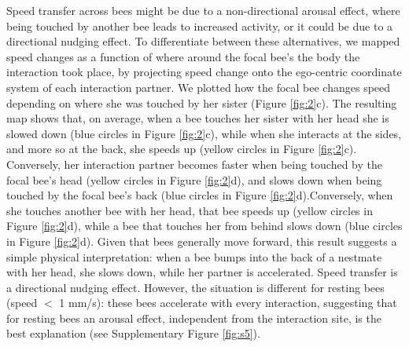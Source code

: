\documentclass{article}
\newcommand{\added}[1]{{\color{blue}#1}}
\newcommand{\deleted}[1]{{\color{red}#1}} %
\newcommand{\replaced}[2]{\deleted{#1}\added{#2}}
\newcommand{\added}[1]{#1}
\newcommand{\deleted}[1]{}
\newcommand{\replaced}[2]{#2}
\begin{document}
Speed transfer across bees might be due to a non-directional arousal effect, where being touched by another bee leads to increased activity, or it could be due to a directional nudging effect. To differentiate between these alternatives, we mapped speed changes as a function of where around the focal bee's the body the interaction took place, by projecting speed change onto the ego-centric coordinate system of each interaction partner. We plotted how the focal bee changes speed depending on where she was touched by her sister (Figure \ref{fig:2}c). The resulting map shows that, on average, when a bee touches her sister with her head she is slowed down (blue circles in Figure \ref{fig:2}c), while when she interacts at the sides, and more so at the back, she speeds up (yellow circles in Figure \ref{fig:2}c). \replaced{Conversely, her interaction partner becomes faster when being touched by the focal bee’s head (yellow circles in Figure \ref{fig:2}d), and slows down when being touched by the focal bee’s back (blue circles in Figure \ref{fig:2}d).}{Conversely, when she touches another bee with her head, that bee speeds up (yellow circles in Figure \ref{fig:2}d), while a bee that touches her from behind slows down (blue circles in Figure \ref{fig:2}d).} Given that bees generally move forward, this result suggests a simple physical interpretation: when a bee bumps into the back of a nestmate with her head, she slows down, while her partner is accelerated. Speed transfer is a directional nudging effect. However, the situation is different for resting bees (speed $<$ 1 mm/s): these bees accelerate with every interaction, suggesting that for resting bees an arousal effect, independent from the interaction site, is the best explanation (see Supplementary Figure \ref{fig:s5}).
\end{document}
